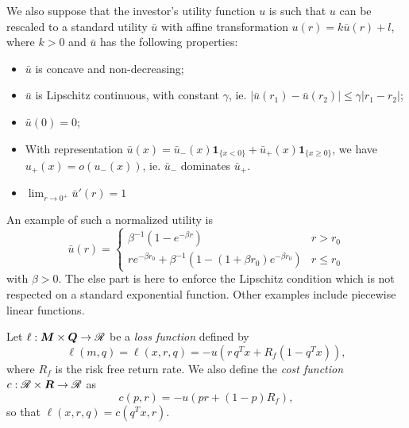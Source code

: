 \documentclass[11pt]{article}
\begin{document}
\begin{assumption}
  We also suppose that the investor's utility function $u$ is such that $u$ can be
  rescaled to a standard utility $\bar u$ with affine transformation
  $u(r) = k\bar u(r) + l$, where $k>0$ and $\bar u$ has the following properties:
  \begin{itemize}
  \item $\bar u$ is concave and non-decreasing;
  \item $\bar u$ is Lipschitz continuous, with constant $\gamma$, ie.
    $|\bar u(r_1) - \bar u(r_2)| \leq \gamma|r_1-r_2|$; 
  \item $\bar u(0) = 0$;
  \item With representation
    $\bar u(x) = \bar u_-(x)\bm1_{\{x<0\}}+\bar u_+(x)\bm 1_{\{x\geq 0\}}$, we have
    $u_+(x) = o(u_-(x))$, ie. $\bar u_-$ dominates $\bar u_+$. 
  \item $\lim_{r\to 0^{+}} \bar u'(r) = 1$ 
  \end{itemize}

  An example of such a normalized utility is 
  \begin{equation*}
    \bar u(r) = \begin{cases}
      \beta^{-1}(1-e^{-\beta r}) & r > r_0\\
      re^{-\beta r_0} + \beta^{-1}(1-(1+\beta r_0)e^{-\beta r_0}) & r \leq r_0
    \end{cases}
  \end{equation*}
  with $\beta>0$. The else part is here to enforce the Lipschitz condition which is not
  respected on a standard exponential function. Other examples include piecewise linear
  functions.
\end{assumption}

\begin{deff}
  Let $\ell:\bm M\times \bm Q\to\mathscr{R}$ be a \textsl{loss function} defined by
  \begin{equation*}
    \ell(m,q) = \ell(x,r,q) = -u(r\,q^{T}x + R_f (1 - q^{T}x)),
  \end{equation*}
  where $R_f$ is the risk free return rate. We also define the \textsl{cost function}
  $c:\mathscr{R}\times\bm R\to\mathscr{R}$ as
  \begin{equation*}
    c(p,r) = -u(pr + (1-p)R_f),
  \end{equation*}
  so that $\ell(x,r,q) = c(q^Tx,r)$. 
\end{deff}
\end{document}
